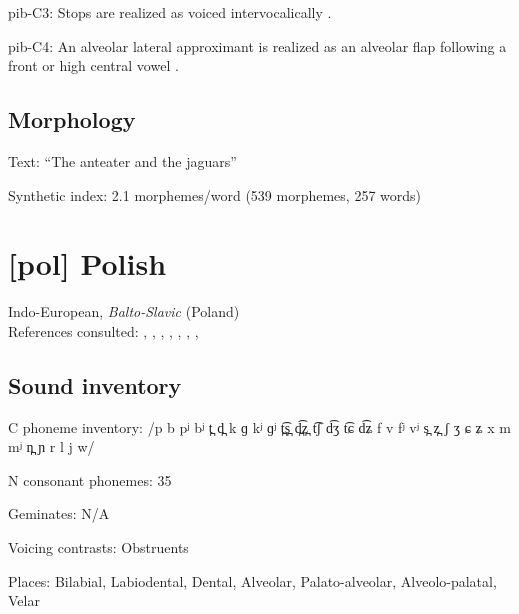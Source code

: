 {\begin{appendixdesc}
\item[pib-C3:] Stops are realized as voiced intervocalically \citep[17]{Hanson2010}.

\item[pib-C4:] An alveolar lateral approximant is realized as an alveolar flap following a front or high central vowel \citep[24]{Hanson2010}.
\end{appendixdesc}
\subsection*{Morphology}

\begin{appendixdesc}

\item[Text:] “The anteater and the jaguars” \citep[379--386]{Hanson2010}

\item[Synthetic index:] 2.1 morphemes/word (539 morphemes, 257 words)
\end{appendixdesc}
\section*{[pol] Polish}   %
Indo-European, \textit{Balto-Slavic} (Poland)\medskip\\
References consulted: \citet{Bargiełowna1950}, \citet{Gussmann2007}, \citet{Jassem2003}, \citet{Newlin-Łokowicz2012}, \citet{Nowak2006}, \citet{Rocławski1976}, \citet{Rubach1974}, \citet{Zydorowicz2010}

\subsection*{Sound inventory}
\begin{appendixdesc}

\item[C phoneme inventory:] /p b pʲ bʲ t̪ d̪ k ɡ kʲ ɡʲ t̪͡s̪ d̪͡z̪ t͡ʃ d͡ʒ t͡ɕ d͡ʑ f v fʲ vʲ s̪ z̪ ʃ ʒ ɕ ʑ x m mʲ n̪ ɲ r l j w/

\item[N consonant phonemes:] 35

\item[Geminates:] N/A

\item[Voicing contrasts:] Obstruents

\item[Places:] Bilabial, Labiodental, Dental, Alveolar, Palato-alveolar, Alveolo-palatal, Velar


\end{appendixdesc}}
